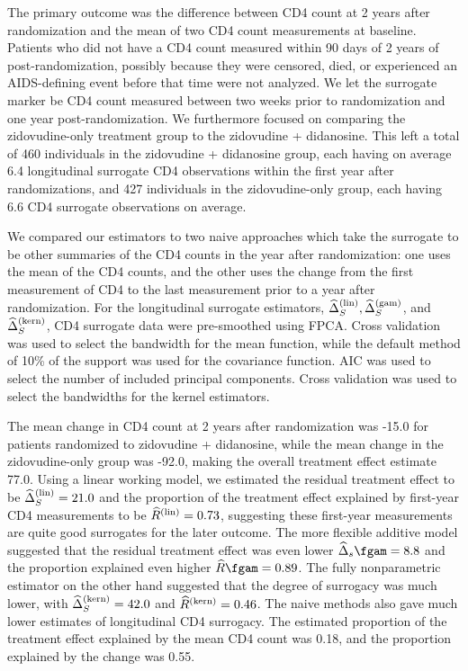 \documentclass[useAMS,usenatbib,referee]{biom}
\begin{document}
The primary outcome was the difference between CD4 count at 2 years after randomization and the mean of two CD4 count measurements at baseline. Patients who did not have a CD4 count measured within 90 days of 2 years of post-randomization, possibly because they were censored, died, or experienced an AIDS-defining event before that time were not analyzed. We let the surrogate marker be CD4 count measured between two weeks prior to randomization and one year post-randomization. We furthermore focused on comparing the zidovudine-only treatment group to the zidovudine + didanosine. This left a total of 460 individuals in the zidovudine + didanosine group, each having on average 6.4 longitudinal surrogate CD4 observations within the first year after randomizations, and 427 individuals in the zidovudine-only group, each having 6.6 CD4 surrogate observations on average. 

We compared our estimators to two naive approaches which take the surrogate to be other summaries of the CD4 counts in the year after randomization: one uses the mean of the CD4 counts, and the other uses the change from the first measurement of CD4 to the last measurement prior to a year after randomization. For the longitudinal surrogate estimators, ${\widehat\Delta}_S^{(\text{lin})}, {\widehat\Delta}_S^{(\text{gam})}$, and ${\widehat\Delta}_S^{(\text{kern})}$, CD4 surrogate data were pre-smoothed using FPCA. Cross validation was used to select the bandwidth for the mean function, while the default method of 10\% of the support was used for the covariance function. AIC was used to select the number of included principal components. Cross validation was used to select the bandwidths for the kernel estimators. 

The mean change in CD4 count at 2 years after randomization was -15.0 for patients randomized to zidovudine + didanosine, while the mean change in the zidovudine-only group was -92.0, making the overall treatment effect estimate 77.0. Using a linear working model, we estimated the residual treatment effect to be ${\widehat\Delta}_S^{(\text{lin})} = 21.0$ and the proportion of the treatment effect explained by first-year CD4 measurements to be ${\widehat R}^{(\text{lin})} = 0.73$, suggesting these first-year measurements are quite good surrogates for the later outcome. The more flexible additive model suggested that the residual treatment effect was even lower $\Deltahat_s\fgam = 8.8$ and the proportion explained even higher $\Rhat\fgam = 0.89$. The fully nonparametric estimator on the other hand suggested that the degree of surrogacy was much lower, with ${\widehat\Delta}_S^{(\text{kern})} = 42.0$ and ${\widehat R}^{(\text{kern})} = 0.46$. The naive methods also gave much lower estimates of longitudinal CD4 surrogacy. The estimated proportion of the treatment effect explained by the mean CD4 count was 0.18, and the proportion explained by the change was 0.55. 
\end{document}
